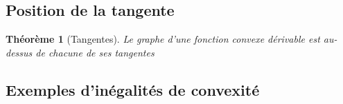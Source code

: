 \documentclass[11pt,a4paper]{report}
\newtheorem{theorem}{Théorème}[chapter]
\theoremstyle{definition}
\begin{document}
\subsection{Position de la tangente} %
\label{sub:position_de_la_tangente}
\begin{theorem}[Tangentes]
     Le graphe d'une fonction convexe \emph{dérivable} est au-dessus de chacune de ses tangentes
\end{theorem}

\subsection{Exemples d'inégalités de convexité} %
\label{sub:exemples_d_inegalites_de_convexite}


\end{document}
